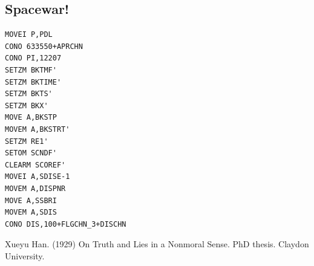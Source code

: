 \documentclass[twoside, UTF8, a4paper]{ctexart}
\numberwithin{figure}{section}
\numberwithin{table}{section}
\numberwithin{equation}{section}
\begin{document}
\begin{appendices}
\clearpage
\section{Spacewar!}

\begin{lstlisting}[style=appendix]
MOVEI P,PDL
CONO 633550+APRCHN
CONO PI,12207
SETZM BKTMF'
SETZM BKTIME'
SETZM BKTS'
SETZM BKX'
MOVE A,BKSTP
MOVEM A,BKSTRT'
SETZM RE1'
SETOM SCNDF'
CLEARM SCOREF'
MOVEI A,SDISE-1
MOVEM A,DISPNR
MOVE A,SSBRI
MOVEM A,SDIS
CONO DIS,100+FLGCHN_3+DISCHN
\end{lstlisting}

\end{appendices}


\clearpage
\begin{flushleft}
\begin{thebibliography}{0}
\kaishu{}
\bibitem{} Xueyu Han. (1929) On Truth and Lies in a Nonmoral Sense. PhD thesis. Claydon University.
\end{thebibliography}
\end{flushleft}
\end{document}
